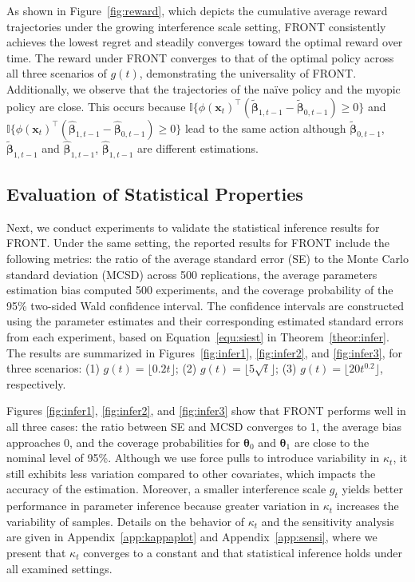 \documentclass[12pt]{article}
\begin{document}
As shown in Figure~\ref{fig:reward}, which depicts the cumulative average reward trajectories under the growing interference scale setting, FRONT consistently achieves the lowest regret and steadily converges toward the optimal reward over time. The reward under FRONT converges to that of the optimal policy across all three scenarios of $g(t)$, demonstrating the universality of FRONT.  Additionally, we observe that the trajectories of the na\"ive policy and the myopic policy are close. This occurs because $\mathbb{I}\{\phi(\bm{x}_t)^{\top}(\tilde{\bm{\beta}}_{1,t-1} - \tilde{\bm{\beta}}_{0,t-1}) \ge 0\}$ and $\mathbb{I}\{\phi(\bm{x}_t)^{\top}(\widehat{\bm{\beta}}_{1,t-1} - \widehat{\bm{\beta}}_{0,t-1}) \ge 0\}$ lead to the same action although $\tilde{\bm{\beta}}_{0,t-1}$, $\tilde{\bm{\beta}}_{1,t-1}$ and $\widehat{\bm{\beta}}_{1,t-1}$, $\widehat{\bm{\beta}}_{1,t-1}$ are different estimations. 


 



\subsection{Evaluation of Statistical Properties}
\label{sec:eva}

Next, we conduct experiments to validate the statistical inference results for FRONT. Under the same setting, the reported results for FRONT include the following metrics: the ratio of the average standard error (SE) to the Monte Carlo standard deviation (MCSD) across 500 replications, the average parameters estimation bias computed 500 experiments, and the coverage probability of the 95\% two-sided Wald confidence interval. The confidence intervals are constructed using the parameter estimates and their corresponding estimated standard errors from each experiment, based on Equation~\eqref{equ:siest} in Theorem~\ref{theor:infer}. The results are summarized in Figures~\ref{fig:infer1}, \ref{fig:infer2}, and \ref{fig:infer3}, for three scenarios: (1) $g(t) = \lfloor 0.2t \rfloor$; (2) $g(t) = \lfloor 5\sqrt{t} \rfloor$; (3) $g(t) = \lfloor 20t^{0.2} \rfloor$, respectively.

 

Figures \ref{fig:infer1}, \ref{fig:infer2}, and \ref{fig:infer3} show that FRONT performs well in all three cases: the ratio between SE and MCSD converges to 1, the average bias approaches 0, and the coverage probabilities for \(\bm{\theta}_0\) and \(\bm{\theta}_1\) are close to the nominal level of 95\%. Although we use force pulls to introduce variability in \(\kappa_t\), it still exhibits less variation compared to other covariates, which impacts the accuracy of the estimation. Moreover, a smaller interference scale $g_t$ yields better performance in parameter inference because greater variation in \(\kappa_t\) increases the variability of samples. Details on the behavior of $\kappa_t$ and the sensitivity analysis are given in Appendix~\ref{app:kappaplot} and Appendix~\ref{app:sensi}, where we present that $\kappa_t$ converges to a constant and that statistical inference holds under all examined settings.
\end{document}

